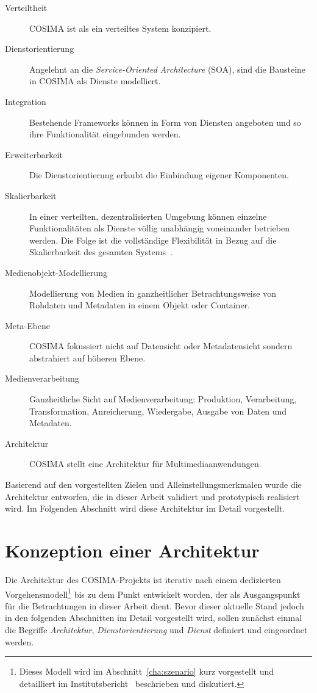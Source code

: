   \begin{description}
    \item[Verteiltheit] COSIMA ist als ein verteiltes System konzipiert.
    \item[Dienstorientierung] Angelehnt an die \emph{Service-Oriented Architecture} (SOA), sind die Bausteine in COSIMA als Dienste modelliert.
    \item[Integration] Bestehende Frameworks können in Form von Diensten angeboten und so ihre Funktionalität eingebunden werden.
    \item[Erweiterbarkeit] Die Dienstorientierung erlaubt die Einbindung eigener Komponenten.
    \item[Skalierbarkeit] In einer verteilten, dezentralisierten Umgebung können einzelne Funktionalitäten als Dienste völlig unabhängig voneinander betrieben werden. Die Folge ist die vollständige Flexibilität in Bezug auf die Skalierbarkeit des gesamten Systems~\citep[S. 294]{web_services_principles_and_technology}.
    \item[Medienobjekt-Modellierung] Modellierung von Medien in ganzheitlicher Betrachtungsweise von Rohdaten und Metadaten in einem Objekt oder Container.
    \item[Meta-Ebene] COSIMA fokussiert nicht auf Datensicht oder Metadatensicht sondern abstrahiert auf höheren Ebene.
    \item[Medienverarbeitung] Ganzheitliche Sicht auf Medienverarbeitung: Produktion, Verarbeitung, Transformation, Anreicherung, Wiedergabe, Ausgabe von Daten und Metadaten.
    \item[Architektur] COSIMA stellt eine Architektur für Multimediaanwendungen.
  \end{description}
  
  Basierend auf den vorgestellten Zielen und Alleinstellungsmerkmalen wurde die Architektur entworfen, die in dieser Arbeit validiert und prototypisch realisiert wird. Im Folgenden Abschnitt wird diese Architektur im Detail vorgestellt.


\section{Konzeption einer Architektur} %
\label{sec:architektur}

  Die Architektur des COSIMA-Projekts ist iterativ nach einem dedizierten Vorgehensmodell\footnote{Dieses Modell wird im Abschnitt~\ref{cha:szenario} kurz vorgestellt und detailliert im Institutsbericht~\citep[S. 7ff]{bericht} beschrieben und diskutiert.} bis zu dem Punkt entwickelt worden, der als Ausgangspunkt für die Betrachtungen in dieser Arbeit dient. Bevor dieser aktuelle Stand jedoch in den folgenden Abschnitten im Detail vorgestellt wird, sollen zunächst einmal die Begriffe \emph{Architektur}, \emph{Dienstorientierung} und \emph{Dienst} definiert und eingeordnet werden.
  
